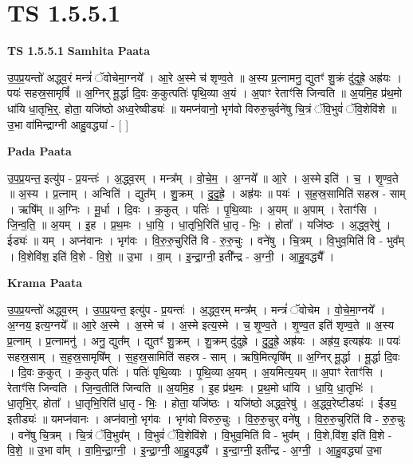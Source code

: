 \documentclass[17pt]{extarticle}
\begin{document}
\section*{ TS 1.5.5.1 }

\textbf{TS 1.5.5.1 } \newline
\textbf{Samhita Paata} \newline

उ॒प॒प्र॒यन्तो॑ अद्ध्व॒रं मन्त्रं॑ ॅवोचेमा॒ग्नये᳚ । आ॒रे अ॒स्मे च॑ शृण्व॒ते ॥ अ॒स्य प्र॒त्नामनु॒ द्युतꣳ॑ शु॒क्रं दु॑दुह्रे॒ अह्र॑यः । पयः॑ सहस्र॒सामृषिं᳚ ॥ अ॒ग्निर् मू॒र्द्धा दि॒वः क॒कुत्पतिः॑ पृथि॒व्या अ॒यं । अ॒पाꣳ रेताꣳ॑सि जिन्वति ॥ अ॒यमि॒ह प्र॑थ॒मो धा॑यि धा॒तृभि॒र्॒. होता॒ यजि॑ष्ठो अध्व॒रेष्वीड्यः॑ ॥ यमप्न॑वानो॒ भृग॑वो विरुरु॒चुर्वने॑षु चि॒त्रं ॅवि॒भुवं॑ ॅवि॒शेवि॑शे ॥ उ॒भा वा॑मिन्द्राग्नी आहु॒वद्ध्या॑ - [ ] \newline

\textbf{Pada Paata} \newline

उ॒प॒प्र॒यन्त॒ इत्यु॑प - प्र॒यन्तः॑ । अ॒द्ध्व॒रम् । मन्त्र᳚म् । वो॒चे॒म॒ । अ॒ग्नये᳚ ॥ आ॒रे । अ॒स्मे इति॑ । च॒ । शृ॒ण्व॒ते ॥ अ॒स्य । प्र॒त्नाम् । अन्विति॑ । द्युत᳚म् । शु॒क्रम् । दु॒दु॒ह्रे॒ । अह्र॑यः ॥ पयः॑ । स॒ह॒स्र॒सामिति॑ सहस्र - साम् । ऋषि᳚म् ॥ अ॒ग्निः । मू॒र्धा । दि॒वः । क॒कुत् । पतिः॑ । पृ॒थि॒व्याः । अ॒यम् ॥ अ॒पाम् । रेताꣳ॑सि । जि॒न्व॒ति॒ ॥ अ॒यम् । इ॒ह । प्र॒थ॒मः । धा॒यि॒ । धा॒तृभि॒रिति॑ धा॒तृ - भिः॒ । होता᳚ । यजि॑ष्ठः । अ॒द्ध्व॒रेषु॑ । ईड्यः॑ ॥ यम् । अप्न॑वानः । भृग॑वः । वि॒रु॒रु॒चुरिति॑ वि - रु॒रु॒चुः । वने॑षु । चि॒त्रम् । वि॒भुव॒मिति॑ वि - भुव᳚म् । वि॒शेवि॑श॒ इति॑ वि॒शे - वि॒शे॒ ॥ उ॒भा । वा॒म् । इ॒न्द्रा॒ग्नी॒ इती᳚न्द्र - अ॒ग्नी॒ । आ॒हु॒वद्ध्यै᳚ ।  \newline


\textbf{Krama Paata} \newline

उ॒प॒प्र॒यन्तो॑ अद्ध्व॒रम् । उ॒प॒प्र॒यन्त॒ इत्यु॑प - प्र॒यन्तः॑ । अ॒द्ध्व॒रम् मन्त्र᳚म् । मन्त्रं॑ ॅवोचेम । वो॒चे॒मा॒ग्नये᳚ । अ॒ग्नय॒ इत्य॒ग्नये᳚ ॥ आ॒रे अ॒स्मे । अ॒स्मे च॑ । अ॒स्मे इत्य॒स्मे । च॒ शृ॒ण्व॒ते । शृ॒ण्व॒त इति॑ शृण्व॒ते ॥ अ॒स्य प्र॒त्नाम् । प्र॒त्नामनु॑ । अनु॒ द्युत᳚म् । द्युतꣳ॑ शु॒क्रम् । शु॒क्रम् दु॑दुह्रे । दु॒दु॒ह्रे॒ अह्र॑यः । अह्र॑य॒ इत्यह्र॑यः ॥ पयः॑ सहस्र॒साम् । स॒ह॒स्र॒सामृषि᳚म् । स॒ह॒स्र॒सामिति॑ सहस्र - साम् । ऋषि॒मित्यृषि᳚म् ॥ अ॒ग्निर् मू॒र्द्धा । मू॒र्द्धा दि॒वः । दि॒वः क॒कुत् । क॒कुत् पतिः॑ । पतिः॑ पृथि॒व्याः । पृ॒थि॒व्या अ॒यम् । अ॒यमित्य॒यम् ॥ अ॒पाꣳ रेताꣳ॑सि । रेताꣳ॑सि जिन्वति । जि॒न्व॒तीति॑ जिन्वति ॥ अ॒यमि॒ह । इ॒ह प्र॑थ॒मः । प्र॒थ॒मो धा॑यि । धा॒यि॒ धा॒तृभिः॑ । धा॒तृभि॒र्. होता᳚ । धा॒तृभि॒रिति॑ धा॒तृ - भिः॒ । होता॒ यजि॑ष्ठः । यजि॑ष्ठो अद्ध्व॒रेषु॑ । अ॒द्ध्व॒रेष्टीड्यः॑ । ईड्य॒ इतीड्यः॑ ॥ यमप्न॑वानः । अप्न॑वानो॒ भृग॑वः । भृग॑वो विरुरु॒चुः । वि॒रु॒रु॒चुर् वने॑षु । वि॒रु॒रु॒चुरिति॑ वि - रु॒रु॒चुः । वने॑षु चि॒त्रम् । चि॒त्रं ॅवि॒भुव᳚म् । वि॒भुवं॑ ॅवि॒शेवि॑शे । वि॒भुव॒मिति॑ वि - भुव᳚म् । वि॒शे,वि॑श॒ इति॑ वि॒शे - वि॒शे॒ ॥ उ॒भा वा᳚म् । वा॒मि॒न्द्रा॒ग्नी॒ । इ॒न्द्रा॒ग्नी॒ आ॒हु॒वद्ध्यै᳚ । इ॒न्दा॒ग्नी॒ इती᳚न्द्र - अ॒ग्नी॒ । आ॒हु॒वद्ध्या॑ उ॒भा \newline
\end{document}
